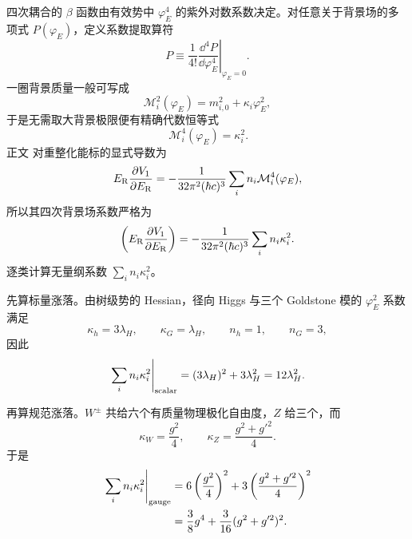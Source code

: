 \begin{derivation}
四次耦合的 $\beta$ 函数由有效势中 $\varphi_E^4$ 的紫外对数系数决定。对任意关于背景场的多项式 $P(\varphi_E)$，定义系数提取算符
\begin{equation*}
 [\varphi_E^4]P
 \equiv\frac1{4!}\left.\frac{\dd^4P}{\dd\varphi_E^4}\right|_{\varphi_E=0}.
\end{equation*}
一圈背景质量一般可写成
\begin{equation*}
 \mathcal M_i^2(\varphi_E)=m_{i,0}^2+\kappa_i\varphi_E^2,
\end{equation*}
于是无需取大背景极限便有精确代数恒等式
\begin{equation*}
 [\varphi_E^4]\,\mathcal M_i^4(\varphi_E)=\kappa_i^2.
\end{equation*}
正文 对重整化能标的显式导数为
\begin{equation*}
 E_{\rm R}\frac{\partial V_1}{\partial E_{\rm R}}
 =-\frac1{32\pi^2(\hbar c)^3}
 \sum_i n_i\mathcal M_i^4(\varphi_E),
\end{equation*}
所以其四次背景场系数严格为
\begin{equation*}
 [\varphi_E^4]\left(E_{\rm R}\frac{\partial V_1}{\partial E_{\rm R}}\right)
 =-\frac1{32\pi^2(\hbar c)^3}\sum_i n_i \kappa_i^2.
\end{equation*}
逐类计算无量纲系数 $\sum_i n_i \kappa_i^2$。

先算标量涨落。由树级势的 Hessian，径向 Higgs 与三个 Goldstone 模的 $\varphi_E^2$ 系数满足
\begin{equation*}
 \kappa_h=3\lambda_H,
 \qquad
 \kappa_G=\lambda_H,
 \qquad
 n_h=1,
 \qquad
 n_G=3,
\end{equation*}
因此
\begin{equation*}
 \left.\sum_i n_i \kappa_i^2\right|_{\rm scalar}
 =(3\lambda_H)^2+3\lambda_H^2
 =12\lambda_H^2.
\end{equation*}

再算规范涨落。$W^\pm$ 共给六个有质量物理极化自由度，$Z$ 给三个，而
\begin{equation*}
 \kappa_W=\frac{g^2}{4},
 \qquad
 \kappa_Z=\frac{g^2+g'^2}{4}.
\end{equation*}
于是
\begin{align*}
 \left.\sum_i n_i \kappa_i^2\right|_{\rm gauge}
 &=6\left(\frac{g^2}{4}\right)^2
 +3\left(\frac{g^2+g'^2}{4}\right)^2\\
 &=\frac38g^4+\frac{3}{16}(g^2+g'^2)^2.
\end{align*}


\end{derivation}
